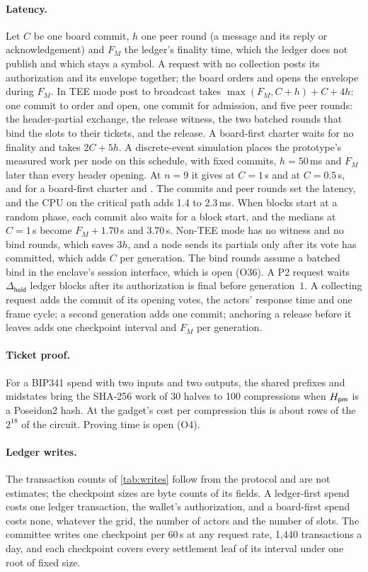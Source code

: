 \paragraph{Latency.} Let $C$ be one board commit, $h$ one peer round (a message and its reply or acknowledgement) and $F_M$ the ledger's finality time, which the ledger does not publish and which stays a symbol. A request with no collection posts its authorization and its envelope together; the board orders and opens the envelope during $F_M$. In TEE mode post to broadcast takes $\max(F_M, C + h) + C + 4h$: one commit to order and open, one commit for admission, and five peer rounds: the header-partial exchange, the release witness, the two batched rounds that bind the slots to their tickets, and the release. A board-first charter waits for no finality and takes $2C + 5h$. A discrete-event simulation places the prototype's measured work per node on this schedule, with fixed commits, $h = 50$\,ms and $F_M$ later than every header opening. At $n = 9$ it gives \estLatMidOne{} at $C = 1$\,s and \estLatMidHalf{} at $C = 0.5$\,s, and for a board-first charter \estLatBfOne{} and \estLatBfHalf. The commits and peer rounds set the latency, and the CPU on the critical path adds 1.4 to 2.3\,ms. When blocks start at a random phase, each commit also waits for a block start, and the medians at $C = 1$\,s become $F_M + 1.70$\,s and 3.70\,s. Non-TEE mode has no witness and no bind rounds, which saves $3h$, and a node sends its partials only after its  vote has committed, which adds $C$ per generation. The bind rounds assume a batched bind in the enclave's session interface, which is open (O36). A P2 request waits $\Delta_{\mathsf{hold}}$ ledger blocks after its authorization is final before generation~$1$. A collecting request adds the commit of its opening votes, the actors' response time and one frame cycle; a second generation adds one commit; anchoring a release before it leaves adds one checkpoint interval and $F_M$ per generation.

\paragraph{Ticket proof.} For a BIP341 spend with two inputs and two outputs, the shared prefixes and midstates bring the SHA-256 work of 30 halves to 100 compressions when $H_{\mathsf{pm}}$ is a Poseidon2 hash. At the gadget's cost per compression this is about \estCircuitRows{} rows of the $2^{18}$ of the circuit. Proving time is open (O4).

\paragraph{Ledger writes.} The transaction counts of \cref{tab:writes} follow from the protocol and are not estimates; the checkpoint sizes are byte counts of its fields. A ledger-first spend costs one ledger transaction, the wallet's authorization, and a board-first spend costs none, whatever the grid, the number of actors and the number of slots. The committee writes one checkpoint per 60\,s at any request rate, 1{,}440 transactions a day, and each checkpoint covers every settlement leaf of its interval under one root of fixed size.
